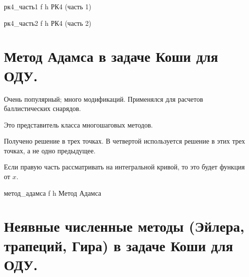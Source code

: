 {рк4_часть1} %
{f} %
{h} %
{\textwidth} %
{РК4 (часть 1)}

{рк4_часть2} %
{f} %
{h} %
{\textwidth} %
{РК4 (часть 2)}

\section*{Метод Адамса в задаче Коши для ОДУ.} 

Очень популярный; много модификаций. Применялся для расчетов баллистических снарядов.

Это представитель класса многошаговых методов.

Получено решение в трех точках. В четвертой используется решение в этих трех точках, а не одно предыдущее.

Если правую часть рассматривать на интегральной кривой, то это будет функция от $x$.

{метод_адамса} %
{f} %
{h} %
{\textwidth} %
{Метод Адамса}


\section*{Неявные численные методы (Эйлера, трапеций, Гира) в задаче Коши для ОДУ.} 